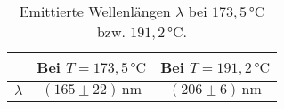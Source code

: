 \begin{table}[H]
    \centering
    \caption{Emittierte Wellenlängen $\lambda$ bei $173,5 \,\unit{\celsius}$ bzw. $191,2 \,\unit{\celsius}$.}
    \label{tab:wellenläng}
    \begin{tabular}{S S[table-format = 2.3] S[table-format = 2.3]}
      \toprule
      {}      &     {Bei $T = 173,5 \,\unit{\celsius}$} & {Bei $T = 191,2 \,\unit{\celsius}$}\\
      \midrule
         {$\lambda$}      &       {$\left( 165 \pm 22 \right)\, \unit{\nano\meter}$}      &     {$\left( 206 \pm 6 \right) \, \unit{\nano\meter}$}           \\
      \bottomrule
    \end{tabular}
\end{table}